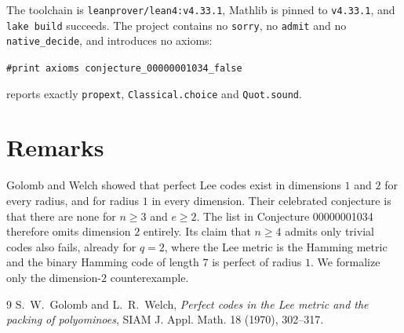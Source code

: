 \documentclass[11pt]{article}
\theoremstyle{plain}
\theoremstyle{definition}
\theoremstyle{remark}
\begin{document}
The toolchain is \texttt{leanprover/lean4:v4.33.1}, Mathlib is pinned to
\texttt{v4.33.1}, and \texttt{lake build} succeeds. The project contains no
\texttt{sorry}, no \texttt{admit} and no \texttt{native\_decide}, and
introduces no axioms:
\begin{center}
\texttt{\#print axioms conjecture\_00000001034\_false}
\end{center}
reports exactly \texttt{propext}, \texttt{Classical.choice} and
\texttt{Quot.sound}.

\section{Remarks}

Golomb and Welch \cite{gw} showed that perfect Lee codes exist in dimensions
$1$ and $2$ for every radius, and for radius $1$ in every dimension. Their
celebrated conjecture is that there are none for $n\ge3$ and $e\ge2$. The list
in Conjecture 00000001034 therefore omits dimension $2$ entirely. Its claim that
$n\ge4$ admits only trivial codes also fails, already for $q=2$, where the Lee
metric is the Hamming metric and the binary Hamming code of length $7$ is
perfect of radius $1$. We formalize only the dimension-$2$ counterexample.

\begin{thebibliography}{9}
 S.~W.~Golomb and L.~R.~Welch, \emph{Perfect codes in the Lee
  metric and the packing of polyominoes}, SIAM J. Appl. Math. 18 (1970),
  302--317.
\end{thebibliography}
\end{document}
